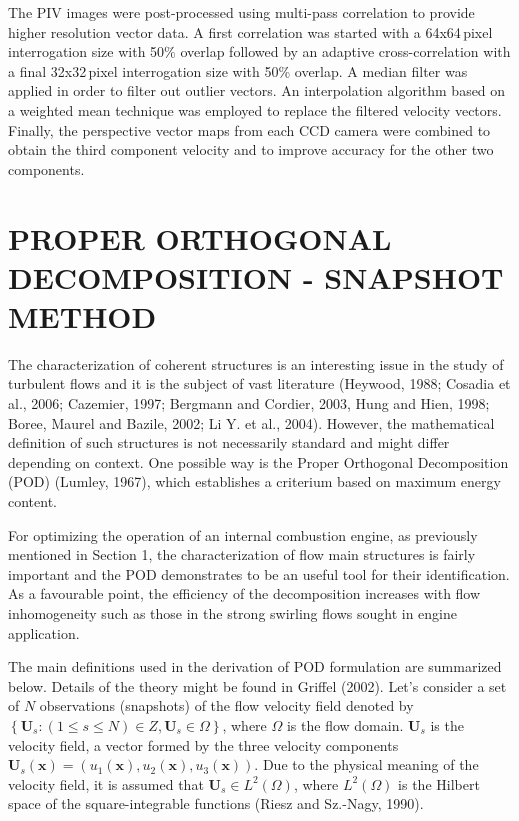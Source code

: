 \documentclass[10pt,fleqn,a4paper]{article}
\newcommand{\bv}[1]{\mathbf{#1}}
\begin{document}
The PIV images were post-processed using multi-pass correlation to provide higher resolution vector data. A first correlation was started with a 64x64\,pixel interrogation size with 50$\%$ overlap followed by an adaptive cross-correlation with a final 32x32\,pixel interrogation size with 50$\%$ overlap. A median filter was applied in order to filter out outlier vectors. An interpolation algorithm based on a weighted mean technique was employed to replace the filtered velocity vectors. Finally, the perspective vector maps from each CCD camera were combined to obtain the third component velocity and to improve accuracy for the other two components.


\section{PROPER ORTHOGONAL DECOMPOSITION - SNAPSHOT METHOD}

The characterization of coherent structures is an interesting issue in the study of turbulent flows and it is the subject of vast literature (Heywood, 1988; Cosadia et al., 2006; Cazemier, 1997; Bergmann and Cordier, 2003, Hung and Hien, 1998; Boree, Maurel and Bazile, 2002; Li Y. et al., 2004). However, the mathematical definition of such structures is not necessarily standard and might differ depending on context. One possible way is the Proper Orthogonal Decomposition (POD) (Lumley, 1967), which establishes a criterium based on maximum energy content.

For optimizing the operation of an internal combustion engine, as previously mentioned in Section 1, the characterization of flow main structures is fairly important and the POD demonstrates to be an useful tool for their identification. As a favourable point, the efficiency of the decomposition increases with flow inhomogeneity such as those in the strong swirling flows sought in engine application. 

The main definitions used in the derivation of POD formulation are summarized below. Details of the theory might be found in Griffel (2002). Let's consider a set of $N$ observations (snapshots) of the flow velocity field denoted by $\left \lbrace \mathbf{U}_{s} : (1 \le s \le N) \in Z, \mathbf{U}_s \in \Omega \right \rbrace$, where $\Omega$ is the flow domain. $\bv{U}_{s}$ is the velocity field, a vector formed by the three velocity components $\bv{U}_{s}(\bv{x})=(u_1 (\bv{x}), u_2 (\bv{x}), u_3(\bv{x}))$. Due to the physical meaning of the velocity field, it is assumed that $\bv{U}_s \in L^2 (\Omega)$, where $L^2(\Omega)$ is the Hilbert space of the square-integrable functions (Riesz and Sz.-Nagy, 1990).
\end{document}
